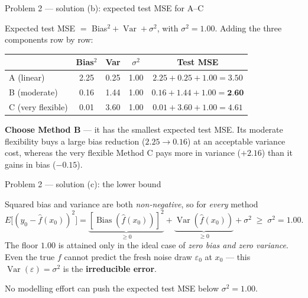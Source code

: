 \documentclass[aspectratio=169,11pt]{beamer}
\begin{document}
\begin{frame}{Problem 2 --- solution (b): expected test MSE for A--C}
  \begin{solutionbox}
    Expected test MSE $=$ Bias$^2+\operatorname{Var}+\sigma^2$, with $\sigma^2=1.00$. Adding the
    three components row by row:
    \begin{center}\footnotesize
    \begin{tabular}{lcccc}
      \toprule
       & Bias$^2$ & Var & $\sigma^2$ & Test MSE\\
      \midrule
      A (linear)        & 2.25 & 0.25 & 1.00 & $2.25+0.25+1.00=3.50$\\
      B (moderate)      & 0.16 & 1.44 & 1.00 & $0.16+1.44+1.00=\textbf{2.60}$\\
      C (very flexible) & 0.01 & 3.60 & 1.00 & $0.01+3.60+1.00=4.61$\\
      \bottomrule
    \end{tabular}
    \end{center}
    \textbf{Choose Method B} --- it has the smallest expected test MSE. Its moderate flexibility
    buys a large bias reduction ($2.25\to0.16$) at an acceptable variance cost, whereas the very
    flexible Method C pays more in variance ($+2.16$) than it gains in bias ($-0.15$).
  \end{solutionbox}
\end{frame}

\begin{frame}{Problem 2 --- solution (c): the lower bound}
  \begin{solutionbox}
    Squared bias and variance are both \emph{non-negative}, so for \emph{every} method
    \[
      E\big[(y_0-\hat f(x_0))^2\big]
      =\underbrace{[\operatorname{Bias}(\hat f(x_0))]^2}_{\ge 0}
      +\underbrace{\operatorname{Var}(\hat f(x_0))}_{\ge 0}
      +\sigma^2 \;\ge\; \sigma^2 = 1.00.
    \]
    The floor $1.00$ is attained only in the ideal case of \emph{zero bias and zero variance}.
    Even the true $f$ cannot predict the fresh noise draw $\varepsilon_0$ at $x_0$ --- this
    $\operatorname{Var}(\varepsilon)=\sigma^2$ is the \textbf{irreducible error}.
  \end{solutionbox}
  \begin{takeaway}[Interpretation]
    No modelling effort can push the expected test MSE below $\sigma^2=1.00$.
  \end{takeaway}
\end{frame}
\end{document}
